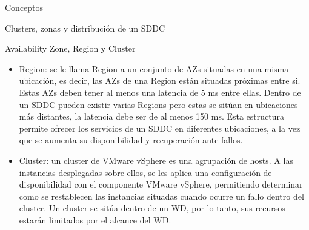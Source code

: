 \begin{section}{Conceptos}
\begin{subsection}{Clusters, zonas y distribución de un SDDC}
\begin{subsubsection}{Availability Zone, Region y Cluster}
\begin{itemize}
  \item Region: se le llama Region a un conjunto de AZs situadas en una misma ubicación, es decir, las AZs de una Region están situadas próximas entre si. Estas AZs deben tener al menos una latencia de 5 ms entre ellas. Dentro de un SDDC pueden existir varias Regions pero estas se sitúan en ubicaciones más distantes, la latencia debe ser de al menos 150 ms. Esta estructura permite ofrecer los servicios de un SDDC en diferentes ubicaciones, a la vez que se aumenta su disponibilidad y recuperación ante fallos.
  
  \item Cluster: un cluster de VMware vSphere es una agrupación de hosts. A las instancias desplegadas sobre ellos, se les aplica una configuración de disponibilidad con el componente VMware vSphere, permitiendo determinar como se restablecen las instancias situadas cuando ocurre un fallo dentro del cluster. Un cluster se sitúa dentro de un WD, por lo tanto, sus recursos estarán limitados por el alcance del WD. 
\end{itemize} 


\end{subsubsection}
\end{subsection}
\end{section}
